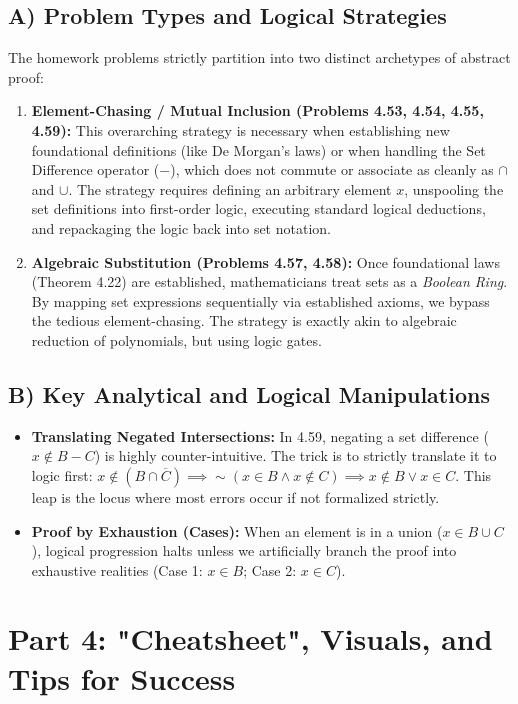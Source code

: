 \documentclass[11pt]{article}
\theoremstyle{definition}
\begin{document}
\subsection{A) Problem Types and Logical Strategies}
The homework problems strictly partition into two distinct archetypes of abstract proof:
\begin{enumerate}
    \item \textbf{Element-Chasing / Mutual Inclusion (Problems 4.53, 4.54, 4.55, 4.59):} This overarching strategy is necessary when establishing new foundational definitions (like De Morgan's laws) or when handling the Set Difference operator ($-$), which does not commute or associate as cleanly as $\cap$ and $\cup$. The strategy requires defining an arbitrary element $x$, unspooling the set definitions into first-order logic, executing standard logical deductions, and repackaging the logic back into set notation.
    \item \textbf{Algebraic Substitution (Problems 4.57, 4.58):} Once foundational laws (Theorem 4.22) are established, mathematicians treat sets as a \textit{Boolean Ring}. By mapping set expressions sequentially via established axioms, we bypass the tedious element-chasing. The strategy is exactly akin to algebraic reduction of polynomials, but using logic gates.
\end{enumerate}

\subsection{B) Key Analytical and Logical Manipulations}
\begin{itemize}
    \item \textbf{Translating Negated Intersections:} In 4.59, negating a set difference ($x \notin B - C$) is highly counter-intuitive. The trick is to strictly translate it to logic first: $x \notin (B \cap \overline{C}) \implies \sim(x \in B \land x \notin C) \implies x \notin B \lor x \in C$. This leap is the locus where most errors occur if not formalized strictly.
    \item \textbf{Proof by Exhaustion (Cases):} When an element is in a union ($x \in B \cup C$), logical progression halts unless we artificially branch the proof into exhaustive realities (Case 1: $x \in B$; Case 2: $x \in C$).
\end{itemize}

\section{Part 4: "Cheatsheet", Visuals, and Tips for Success}
\end{document}
